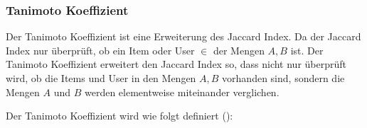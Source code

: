\subsubsection{Tanimoto Koeffizient}
Der Tanimoto Koeffizient ist eine Erweiterung des Jaccard Index. Da der Jaccard Index nur überprüft, ob ein Item oder User $\in$ der Mengen $A,B$ ist.
Der Tanimoto Koeffizient erweitert den Jaccard Index so, dass nicht nur überprüft wird, ob die Items und User in den Mengen $A,B$ vorhanden sind, sondern die Mengen $A$ und $B$ werden elementweise miteinander verglichen.

Der Tanimoto Koeffizient wird wie folgt definiert (\cite{Rogers1960}):
